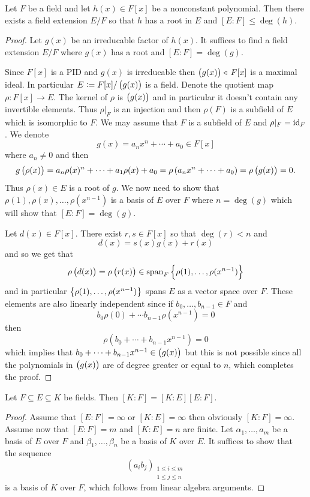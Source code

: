 \documentclass[11pt,a4paper]{article}
\begin{document}
\begin{theorem}
  \label{thm:basic-extension}
  Let $F$ be a field and let $h(x) \in F[x]$ be a nonconstant polynomial.
  Then there exists a field extension $E/F$ so that $h$ has a root
  in $E$ and $[E : F] \le \deg(h)$.
\end{theorem}
\begin{proof}
  Let $g(x)$ be an irreducable factor of $h(x)$.
  It suffices to find a field extension $E/F$ where $g(x)$ has a root
  and $[E : F] = \deg(g)$.

  Since $F[x]$ is a PID and $g(x)$ is irreducable then
  $\del{g(x)} \idealin F[x]$ is a maximal ideal.
  In particular $E := F[x]/\del{g(x)}$ is a field.
  Denote the quotient map $\rho \colon F[x] \to E$.
  The kernel of $\rho$ is $\del{g(x)}$ and in particular it doesn't
  contain any invertible elements.
  Thus $\rho\vert_F$ is an injection
  and then $\rho(F)$ is a subfield of $E$ which is isomorphic to $F$.
  We may assume that $F$ is a subfield of $E$ and $\rho\vert_F = \operatorname{id}_F$.
  We denote
  \[
    g(x) = a_n x^n + \cdots + a_0 \in F[x]
  \]
  where $a_n \neq 0$ and then
  \[
    g\del{\rho(x)} =
    a_n \rho(x)^n + \cdots + a_1 \rho(x) + a_0 =
    \rho\del{a_n x^n + \cdots + a_0} = \rho\del{g(x)} = 0.
  \]
  Thus $\rho(x) \in E$ is a root of $g$.
  We now need to show that $\rho(1),\rho(x),\dots,\rho(x^{n-1})$ is
  a basis of $E$ over $F$ where $n = \deg(g)$
  which will show that $[E : F] = \deg(g)$.

  Let $d(x) \in F[x]$.
  There exist $r,s \in F[x]$ so that $\deg(r) < n$ and
  \[
    d(x) = s(x)g(x) + r(x)
  \]
  and so we get that
  \[
    \rho\del{d(x)} =
    \rho\del{r(x)} \in \vspan_F\set{\rho(1),\dots,\rho(x^{n-1})}
  \]
  and in particular $\left\{\rho(1),\dots,\rho(x^{n-1})\right\}$ spans $E$ as
  a vector space over $F$.
  These elements are also linearly independent since if
  $b_0,\dots,b_{n-1} \in F$ and
  \[
    b_0 \rho(0) + \cdots b_{n-1} \rho(x^{n-1}) = 0
  \]
  then
  \[
    \rho(b_0 + \cdots + b_{n-1} x^{n-1}) = 0
  \]
  which implies that $b_0 + \cdots + b_{n-1} x^{n-1} \in \del{g(x)}$
  but this is not possible since all the polynomials in $\del{g(x)}$
  are of degree greater or equal to $n$, which completes the proof.
\end{proof}

\begin{theorem}
  Let $F \subseteq E \subseteq K$ be fields.
  Then $[K : F] = [K : E] [E : F]$.
\end{theorem}
\begin{proof}
  Assume that $[E : F] = \infty$ or $[K : E] = \infty$ then
  obviously $[K : F] = \infty$.
  Assume now that $[E : F] = m$ and $[K : E] = n$ are finite.
  Let $\alpha_1,\dots,a_{m}$ be a basis of $E$ over $F$ and
  $\beta_1,\dots,\beta_{n}$ be a basis of $K$ over $E$.
  It suffices to show that the sequence
  \[
    (a_i b_j)_{\substack{1 \le i \le m \\ 1 \le j \le n}}
  \]
  is a basis of $K$ over $F$, which follows from linear algebra arguments.
\end{proof}
\end{document}
